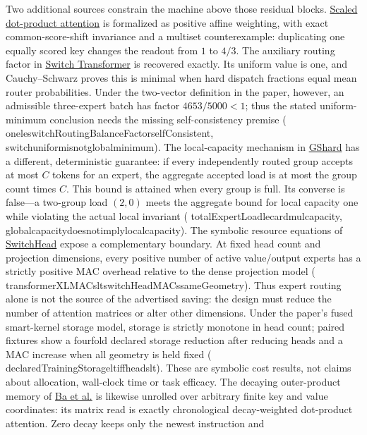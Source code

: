\documentclass[11pt]{article}
\newcommand{\leanname}[1]{{\scriptsize\ttfamily
  \def\_{\textunderscore\allowbreak}#1}}
\begin{document}
Two additional sources constrain the machine above those residual blocks.
\href{https://arxiv.org/abs/1706.03762}{Scaled dot-product attention} is formalized as
positive affine weighting, with exact common-score-shift invariance and a multiset
counterexample: duplicating one equally scored key changes the readout from $1$ to
$4/3$. The auxiliary routing factor in
\href{https://arxiv.org/abs/2101.03961}{Switch Transformer} is recovered exactly.
Its uniform value is one, and Cauchy--Schwarz proves this is minimal when hard dispatch
fractions equal mean router probabilities. Under the two-vector definition in the paper,
however, an admissible three-expert batch has factor $4653/5000<1$; thus the stated
uniform-minimum conclusion needs the missing self-consistency premise
(\leanname{one\_le\_switchRoutingBalanceFactor\_selfConsistent},
\leanname{switch\_uniform\_is\_not\_global\_minimum}).
The local-capacity mechanism in
\href{https://arxiv.org/abs/2006.16668}{GShard} has a different, deterministic
guarantee: if every independently routed group accepts at most $C$ tokens for an
expert, the aggregate accepted load is at most the group count times $C$.
This bound is attained when every group is full.  Its converse is false---a two-group
load $(2,0)$ meets the aggregate bound for local capacity one while violating the
actual local invariant
(\leanname{totalExpertLoad\_le\_card\_mul\_capacity},
\leanname{global\_capacity\_does\_not\_imply\_local\_capacity}).
The symbolic resource equations of
\href{https://arxiv.org/abs/2312.07987}{SwitchHead} expose a complementary
boundary. At fixed head count and projection dimensions, every positive number
of active value/output experts has a strictly positive MAC overhead relative to
the dense projection model
(\leanname{transformerXLMACs\_lt\_switchHeadMACs\_sameGeometry}).
Thus expert routing alone is not the source of the advertised saving: the design
must reduce the number of attention matrices or alter other dimensions. Under
the paper's fused smart-kernel storage model, storage is strictly monotone in
head count; paired fixtures show a fourfold declared storage reduction after
reducing heads and a MAC increase when all geometry is held fixed
(\leanname{declaredTrainingStorage\_lt\_iff\_heads\_lt}).
These are symbolic cost results, not claims about allocation, wall-clock time or
task efficacy.
The decaying outer-product memory of
\href{https://arxiv.org/abs/1610.06258}{Ba et al.} is likewise unrolled over
arbitrary finite key and value coordinates: its matrix read is exactly chronological
decay-weighted dot-product attention. Zero decay keeps only the newest instruction and
\end{document}
